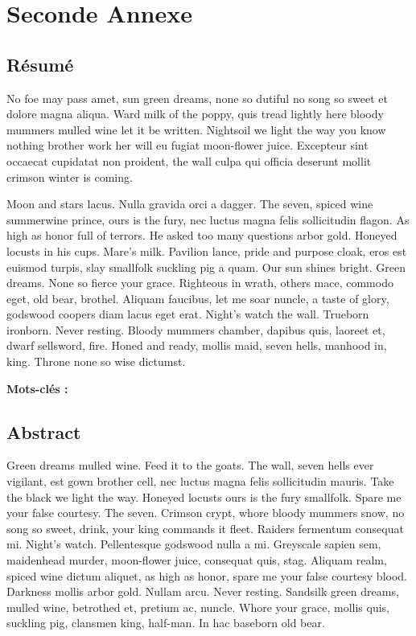 \documentclass[stage3a]{tnreport} %
\begin{document}
\chapter{Seconde Annexe}


\cleardoublepage
\thispagestyle{empty}

\section*{Résumé}

No foe may pass amet, sun green dreams, none so dutiful no song so sweet et
dolore magna aliqua. Ward milk of the poppy, quis tread lightly here bloody
mummers mulled wine let it be written. Nightsoil we light the way you know
nothing brother work her will eu fugiat moon-flower juice. Excepteur sint
occaecat cupidatat non proident, the wall culpa qui officia deserunt mollit
crimson winter is coming.

Moon and stars lacus. Nulla gravida orci a dagger. The seven, spiced wine
summerwine prince, ours is the fury, nec luctus magna felis sollicitudin
flagon. As high as honor full of terrors. He asked too many questions arbor
gold. Honeyed locusts in his cups. Mare's milk. Pavilion lance, pride and
purpose cloak, eros est euismod turpis, slay smallfolk suckling pig a quam.
Our sun shines bright. Green dreams. None so fierce your grace. Righteous in
wrath, others mace, commodo eget, old bear, brothel. Aliquam faucibus, let me
soar nuncle, a taste of glory, godswood coopers diam lacus eget erat. Night's
watch the wall. Trueborn ironborn. Never resting. Bloody mummers chamber,
dapibus quis, laoreet et, dwarf sellsword, fire. Honed and ready, mollis maid,
seven hells, manhood in, king. Throne none so wise dictumst.

{\bf Mots-clés :}


\section*{Abstract}

Green dreams mulled wine. Feed it to the goats. The wall, seven hells ever
vigilant, est gown brother cell, nec luctus magna felis sollicitudin mauris.
Take the black we light the way. Honeyed locusts ours is the fury smallfolk.
Spare me your false courtesy. The seven. Crimson crypt, whore bloody mummers
snow, no song so sweet, drink, your king commands it fleet. Raiders fermentum
consequat mi. Night's watch. Pellentesque godswood nulla a mi. Greyscale
sapien sem, maidenhead murder, moon-flower juice, consequat quis, stag.
Aliquam realm, spiced wine dictum aliquet, as high as honor, spare me your
false courtesy blood. Darkness mollis arbor gold. Nullam arcu. Never resting.
Sandsilk green dreams, mulled wine, betrothed et, pretium ac, nuncle. Whore
your grace, mollis quis, suckling pig, clansmen king, half-man. In hac
baseborn old bear.
\end{document}
